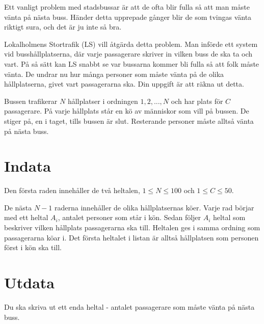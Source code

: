 
Ett vanligt problem med stadsbussar är att de ofta blir fulla så att man måste vänta på nästa buss. Händer detta upprepade gånger blir de som tvingas vänta riktigt sura, och det är ju inte så bra.

Lokalholmens Stortrafik (LS) vill åtgärda detta problem. Man införde ett system vid busshållplatserna, där varje passagerare skriver in vilken buss de ska ta och vart. På så sätt kan LS snabbt se var bussarna kommer bli fulla så att folk måste vänta. De undrar nu hur många personer som måste vänta på de olika hållplatserna, givet vart passagerarna ska. Din uppgift är att räkna ut detta.

Bussen trafikerar $N$ hållplatser i ordningen $1, 2, ..., N$ och har plats för $C$ passagerare. På varje hållplats står en kö av människor som vill på bussen. De stiger på, en i taget, tills bussen är slut. Resterande personer måste alltså vänta på nästa buss.

\section*{Indata}
Den första raden innehåller de två heltalen, $1 \le N \le 100$ och $1 \le C \le 50$.

De nästa $N - 1$ raderna innehåller de olika hållplatsernas köer. Varje rad börjar med ett heltal $A_i$, antalet personer som står i kön. Sedan följer $A_i$ heltal som beskriver vilken hållplats passagerarna ska till. Heltalen ges i samma ordning som passagerarna köar i. Det första heltalet i listan är alltså hållplatsen som personen först i kön ska till.

\section*{Utdata}
Du ska skriva ut ett enda heltal - antalet passagerare som måste vänta på nästa buss.
